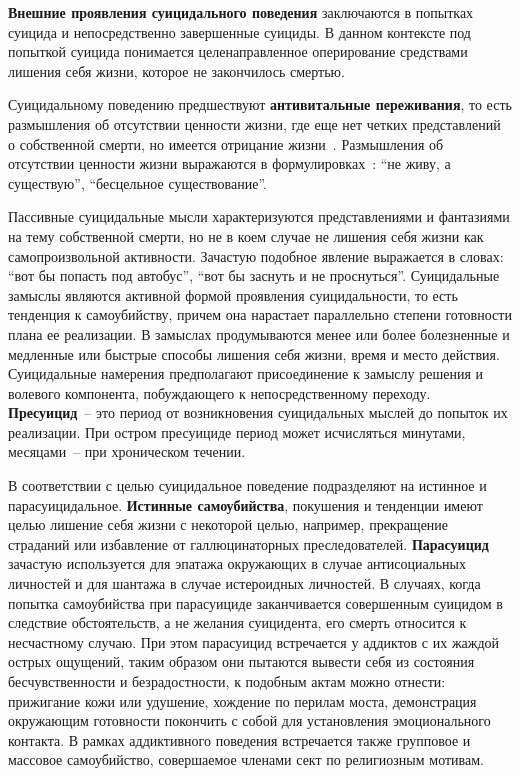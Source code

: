 \textbf{Внешние проявления суицидального поведения} заключаются в попытках суицида и непосредственно завершенные суициды. 
В данном контексте под попыткой суицида понимается целенаправленное оперирование средствами лишения себя жизни, которое не закончилось смертью.~\cite{starsen}

Суицидальному поведению предшествуют \textbf{антивитальные переживания}, то есть размышления об отсутствии ценности жизни, где еще нет четких представлений о собственной смерти, но имеется отрицание жизни~\cite{grishina}. 
Размышления об отсутствии ценности жизни выражаются в формулировках~\cite{starsen}: ``не живу, а существую'', ``бесцельное существование''.

Пассивные суицидальные мысли характеризуются представлениями и фантазиями на тему собственной смерти, но не в коем случае не лишения себя жизни как самопроизвольной активности. Зачастую подобное явление выражается в словах: ``вот бы попасть под автобус'', ``вот бы заснуть и не проснуться''. Суицидальные замыслы являются активной формой проявления суицидальности, то есть тенденция к самоубийству, причем она нарастает параллельно степени готовности плана ее реализации. В замыслах продумываются менее или более болезненные и медленные или быстрые способы лишения себя жизни, время и место действия. Суицидальные намерения предполагают присоединение к замыслу решения и волевого компонента, побуждающего к непосредственному переходу. \textbf{Пресуицид}~-- это период от возникновения суицидальных мыслей до попыток их реализации. При остром пресуициде период может исчисляться минутами, месяцами~-- при хроническом течении.~\cite{starsen}

В соответствии с целью суицидальное поведение подразделяют на истинное и парасуицидальное. \textbf{Истинные самоубийства}, покушения и тенденции имеют целью лишение себя жизни с некоторой целью, например, прекращение страданий или избавление от галлюцинаторных преследователей. \textbf{Парасуицид} зачастую используется для эпатажа окружающих в случае антисоциальных личностей и для шантажа в случае истероидных личностей. В случаях, когда попытка самоубийства при парасуициде заканчивается совершенным суицидом в следствие обстоятельств, а не желания суицидента, его смерть относится к несчастному случаю. При этом парасуицид встречается у аддиктов с их жаждой острых ощущений, таким образом они пытаются вывести себя из состояния бесчувственности и безрадостности, к подобным актам можно отнести: прижигание кожи или удушение, хождение по перилам моста, демонстрация окружающим готовности покончить с собой для установления эмоционального контакта. В рамках аддиктивного поведения встречается также групповое и массовое самоубийство, совершаемое членами сект по религиозным мотивам.~\cite{starsen}

